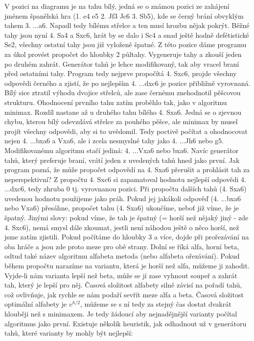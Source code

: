 \documentclass[11pt, titlepage]{article}
\begin{document}
V pozici na diagramu je na tahu bílý, jedná se o známou pozici ze zahájení jménem španělská hra (1. e4 e5 2. Jf3 Jc6 3. Sb5), kde se černý brání obvyklým tahem 3. ...a6. Napadl tedy bílému střelce a ten musí hrozbu nějak pokrýt. Běžné tahy jsou nyní 4. Sa4 a Sxc6, hrát by se dalo i Sc4 a snad ještě hodně defétistické Se2, všechny ostatní tahy jsou již vyloženě špatné. Z této pozice dáme programu za úkol provést propočet do hloubky 2 půltahy. Vygeneruje tahy a zkouší jeden po druhém zahrát. Generátor tahů je lehce modifikovaný, tak aby vracel braní před ostatními tahy. Program tedy nejprve propočítá 4. Sxc6, projde všechny odpovědi černého a zjistí, že po nejlepším 4. ...dxc6 je pozice přibližně vyrovnaná. Bílý sice ztratil výhodu dvojice střelců, ale zase černému znehodnotil pěšcovou strukturu. Ohodnocení prvního tahu zatím proběhlo tak, jako v algoritmu minimax. Rozdíl nastane až u druhého tahu bílého 4. Sxa6. Jedná se o zjevnou chybu, kterou bílý odevzdává střelce za pouhého pěšce, ale minimax by musel projít všechny odpovědi, aby si to uvědomil. Tedy poctivě počítat a ohodnocovat nejen 4. ...bxa6 a Vxa6, ale i zcela nesmyslné tahy jako 4. ...Jh6 nebo g5. Modifikovanému algoritmu stačí jediná: 4. ...Vxa6 nebo bxa6. Navíc generátor tahů, který preferuje braní, vrátí jeden z uvedených tahů hned jako první. Jak program pozná, že může propočet odpovědí na 4. Sxa6 přerušit a prohlásit tah za neperspektivní? Z propočtu 4. Sxc6 si zapamatoval hodnotu nejlepší odpovědi 4. ...dxc6, tedy zhruba 0 tj. vyrovnanou pozici. Při propočtu dalších tahů (4. Sxa6) uvedenou hodnotu použijeme jako práh. Pokud jej jakákoli odpověď (4. ...bxa6 nebo Vxa6) přesáhne, propočet tahu (4. Sxa6) ukončíme, neboť již víme, že je špatný. Jinými slovy: pokud víme, že tah je špatný (= horší než nějaký jiný - zde 4. Sxc6), nemá smysl dále zkoumat, jestli není náhodou ještě o něco horší, než jsme zatím zjistili.
Pokud počítáme do hloubky 3 a více, dojde při prořezávání na oba hráče a jsou zde proto meze pro obě strany. Dolní se říká alfa, horní beta, odtud také název algoritmu alfabeta metoda (nebo alfabeta ořezávání). Pokud během propočtu narazíme na variantu, která je horší než alfa, můžeme ji zahodit. Vyjde-li nám varianta lepší než beta, může se jí zase vyhnout soupeř a zahrát tah, který je lepší pro něj. Časová složitost alfabety silně závisí na pořadí tahů, což ovlivňuje, jak rychle se nám podaří sevřít meze alfa a beta. Časová složitost optimální alfabety je \begin{math}v^{h/2}\end{math}, můžeme se s ní tedy za stejný čas dostat dvakrát hlouběji než s minimaxem. Je tedy žádoucí aby nejnadějnější varianty počítal algoritmus jako první. Existuje několik heuristik, jak odhadnout už v generátoru tahů, které varianty by mohly být nejlepší:
\end{document}
